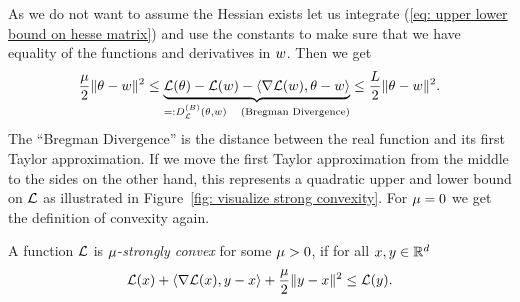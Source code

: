 As we do not want to assume the Hessian exists let us integrate (\ref{eq:
upper lower bound on hesse matrix}) and use the constants to make sure that we
have equality of the functions and derivatives in \(w\). Then we get
\begin{align}\label{eq: bregman divergence upper and lower bound}
	\frac{\mu}{2}\| \theta - w\|^2
	\le \underbrace{
		\mathcal{L}(\theta) - \mathcal{L}(w) - \langle \nabla \mathcal{L}(w), \theta-w\rangle
	}_{=:D^{(B)}_{\mathcal{L}}(\theta, w)\quad\text{(Bregman Divergence)}}
	\le \frac{L}{2}\| \theta - w\|^2.
\end{align}
The ``Bregman Divergence'' is the distance between the real function and its first
Taylor approximation. If we move the first Taylor approximation from the
middle to the sides on the other hand, this represents a quadratic upper and lower
bound on \(\mathcal{L}\) as illustrated in Figure~\ref{fig: visualize strong
convexity}. For \(\mu=0\) we get the definition of convexity again.
\begin{definition}\label{def: strong convexity}
	A function \(\mathcal{L}\) is \(\mu\)-\emph{strongly convex} for some
	\(\mu>0\), if for all \(x,y\in\mathbb{R}^d\)
	\begin{align*}
		\mathcal{L}(x) + \langle \nabla \mathcal{L}(x), y-x\rangle + \frac{\mu}{2}\|y-x\|^2 \le \mathcal{L}(y).
	\end{align*}
\end{definition}

